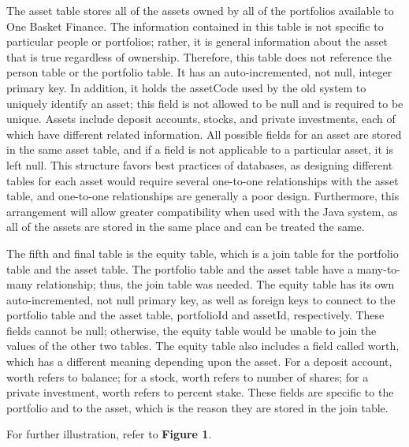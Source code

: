 \documentclass[12pt]{scrartcl} %
\begin{document}
    The asset table stores all of the assets owned by all of the portfolios available to One Basket Finance.  The information contained in this table is not specific to particular people or portfolios; rather, it is general information about the asset that is true regardless of ownership.  Therefore, this table does not reference the person table or the portfolio table.  It has an auto-incremented, not null, integer primary key.  In addition, it holds the assetCode used by the old system to uniquely identify an asset; this field is not allowed to be null and is required to be unique.  Assets include deposit accounts, stocks, and private investments, each of which have different related information.  All possible fields for an asset are stored in the same asset table, and if a field is not applicable to a particular asset, it is left null.  This structure favors best practices of databases, as designing different tables for each asset would require several one-to-one relationships with the asset table, and one-to-one relationships are generally a poor design.  Furthermore, this arrangement will allow greater compatibility when used with the Java system, as all of the assets are stored in the same place and can be treated the same.

    The fifth and final table is the equity table, which is a join table for the portfolio table and the asset table.  The portfolio table and the asset table have a many-to-many relationship; thus, the join table was needed.  The equity table has its own auto-incremented, not null primary key, as well as foreign keys to connect to the portfolio table and the asset table, portfolioId and assetId, respectively.  These fields cannot be null; otherwise, the equity table would be unable to join the values of the other two tables.  The equity table also includes a field called worth, which has a different meaning depending upon the asset.  For a deposit account, worth refers to balance; for a stock, worth refers to number of shares; for a private investment, worth refers to percent stake.  These fields are specific to the portfolio and to the asset, which is the reason they are stored in the join table.

    For further illustration, refer to \textbf{Figure 1}.
\end{document}
